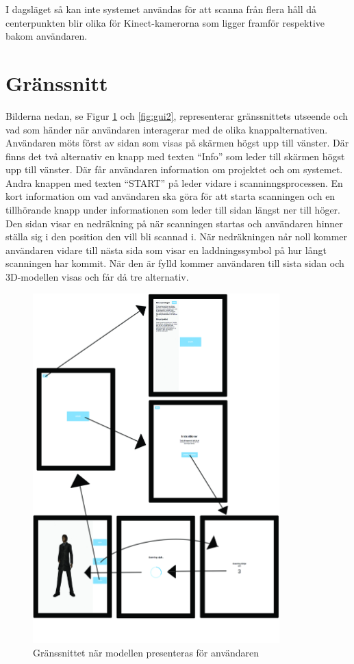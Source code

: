 \documentclass[a4paper,12pt,oneside,final]{extbook}
\begin{document}
I dagsläget så kan inte systemet användas för att scanna från flera håll då centerpunkten blir olika för Kinect-kamerorna som ligger framför respektive bakom användaren.

\section{Gränssnitt}
Bilderna nedan, se Figur \ref{fig:gui1} och \ref{fig:gui2}, representerar gränssnittets utseende och vad som händer när användaren interagerar med de olika knappalternativen. Användaren möts först av sidan som visas på skärmen högst upp till vänster. Där finns det två alternativ en knapp med texten “Info” som leder till skärmen högst upp till vänster. Där får användaren information om projektet och om systemet. Andra knappen med texten “START” på leder vidare i scanninngsprocessen. En kort information om vad användaren ska göra för att starta scanningen och en tillhörande knapp under informationen som leder till sidan längst ner till höger. Den sidan visar en nedräkning på när scanningen startas och användaren hinner ställa sig i den position den vill bli scannad i. När nedräkningen når noll kommer användaren vidare till nästa sida som visar en laddningssymbol på hur långt scanningen har kommit. När den är fylld kommer användaren till sista sidan och 3D-modellen visas och får då tre alternativ.


\begin{figure}[H!]
  \centering
  \includegraphics[width=0.85\textwidth]{bilder/granssnitt.jpg}
  \caption{Gränssnittet när modellen presenteras för användaren}
  \label{fig:gui1}
\end{figure}
\end{document}
